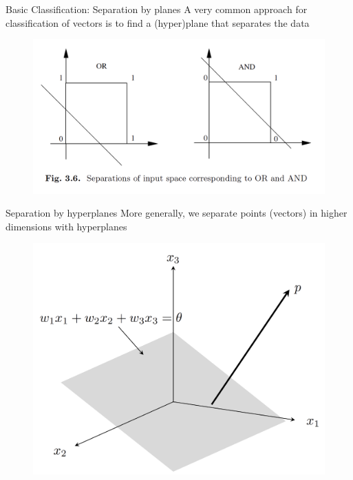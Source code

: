 \documentclass[11pt, aspectratio=43]{beamer}
\begin{document}
\begin{frame}{Basic Classification: Separation by planes}
A very common approach for classification of vectors is to find a (hyper)plane that separates the data
	\begin{figure}[h]
		\centering
		\includegraphics[scale=0.5]{Figures/nn_3.6.png}
	\end{figure}
	
	
\end{frame}


\begin{frame}{Separation by hyperplanes}
More generally, we separate points (vectors) in higher dimensions with hyperplanes

\begin{figure}[h]
	\centering
	\includegraphics[scale=0.25]{Figures/plane_figure.png}
\end{figure}

\end{frame}
\end{document}
